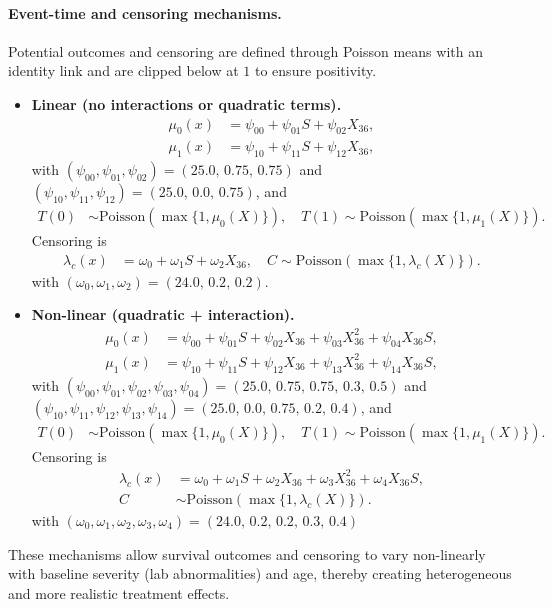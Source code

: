 \documentclass{article} %
\begin{document}
\paragraph{Event-time and censoring mechanisms.}
Potential outcomes and censoring are defined through Poisson means with an identity link and are clipped below at $1$ to ensure positivity.

\begin{itemize}
    \item \textbf{Linear (no interactions or quadratic terms).}
    \begin{align*}
        \mu_0(x) &= \psi_{00} + \psi_{01} S + \psi_{02} X_{36}, \\
        \mu_1(x) &= \psi_{10} + \psi_{11} S + \psi_{12} X_{36},
    \end{align*}
    with $(\psi_{00},\psi_{01},\psi_{02})=(25.0,\,0.75,\,0.75)$ and $(\psi_{10},\psi_{11},\psi_{12})=(25.0,\,0.0,\,0.75)$, and
    \begin{align*}
        T(0) &\sim \mathrm{Poisson}(\max\{1,\mu_0(X)\}),\quad
        T(1) \sim \mathrm{Poisson}(\max\{1,\mu_1(X)\}).
    \end{align*}
    Censoring is
    \begin{align*}
        \lambda_c(x) &= \omega_0 + \omega_1 S + \omega_2 X_{36},\quad
        C \sim \mathrm{Poisson}(\max\{1,\lambda_c(X)\}).
    \end{align*}
    with $(\omega_0,\omega_1,\omega_2)=(24.0,\,0.2,\,0.2)$.

    \item \textbf{Non-linear (quadratic + interaction).}
    \begin{align*}
        \mu_0(x) &= \psi_{00} + \psi_{01} S + \psi_{02} X_{36} + \psi_{03} X_{36}^2 + \psi_{04} X_{36} S, \\
        \mu_1(x) &= \psi_{10} + \psi_{11} S + \psi_{12} X_{36} + \psi_{13} X_{36}^2 + \psi_{14} X_{36} S,
    \end{align*}
    with $(\psi_{00},\psi_{01},\psi_{02},\psi_{03},\psi_{04})=(25.0,\,0.75,\,0.75,\,0.3,\,0.5)$ and $(\psi_{10},\psi_{11},\psi_{12},\psi_{13},\psi_{14})=(25.0,\,0.0,\,0.75,\,0.2,\,0.4)$, and
    \begin{align*}
        T(0) &\sim \mathrm{Poisson}(\max\{1,\mu_0(X)\}),\quad
        T(1) \sim \mathrm{Poisson}(\max\{1,\mu_1(X)\}).
    \end{align*}
    Censoring is
    \begin{align*}
        \lambda_c(x) &= \omega_0 + \omega_1 S + \omega_2 X_{36} + \omega_3 X_{36}^2 + \omega_4 X_{36} S,\\
        C &\sim \mathrm{Poisson}(\max\{1,\lambda_c(X)\}).
    \end{align*}
    with $(\omega_0,\omega_1,\omega_2,\omega_3,\omega_4)=(24.0,\,0.2,\,0.2,\,0.3,\,0.4)$
\end{itemize}
These mechanisms allow survival outcomes and censoring to vary non-linearly with baseline severity (lab abnormalities) and age, thereby creating heterogeneous and more realistic treatment effects.
\end{document}
